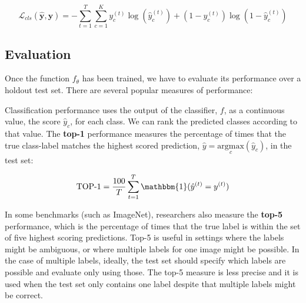 \begin{equation}
    \mathcal{L}_{cls}(\hat{\mathbf{y}},\mathbf{y})
    = -\sum_{t=1}^{T} \sum_{c=1}^{K} y^{(t)}_c \log(\hat{y}^{(t)}_c)
    +
    (1-y^{(t)}_c) \log(1-\hat{y}^{(t)}_c)
\end{equation}






\subsection{Evaluation}

Once the function $f_\theta$ has been trained, we have to evaluate its performance over a holdout test set. There are several popular measures of performance:

Classification performance uses the output of the classifier, $f$, as a continuous value, the score $\hat{y}_c$, for each class. We can rank the predicted classes according to that value. The {\bf top-1} performance measures the percentage of times that the true class-label matches the highest scored prediction, $\hat{y} = \underset{c}{\mathrm{argmax}} ( \hat{y}_c )$, in the test set:

\begin{equation}
    \text{TOP-1} = \frac{100}{T}
    \sum_{t=1}^T \mathbbm{1}( \hat{y}^{(t)} = y^{(t)})
\end{equation}

In some benchmarks (such as ImageNet), researchers also measure the {\bf top-5} performance, which is the percentage of times that the true label is within the set of five highest scoring predictions. Top-5 is useful in settings where the labels might be ambiguous, or where multiple labels for one image might be possible. In the case of multiple labels, ideally, the test set should specify which labels are possible and evaluate only using those. The top-5 measure is less precise and it is used when the test set only contains one label despite that multiple labels might be correct.

